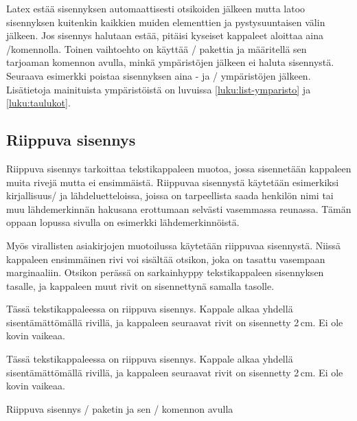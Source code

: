 Latex estää sisennyksen automaattisesti otsikoiden jälkeen mutta latoo
sisennyksen kuitenkin kaikkien muiden elementtien ja pystysuuntaisen
välin jälkeen. Jos sisennys halutaan estää, pitäisi kyseiset kappaleet
aloittaa aina \-/komennolla. Toinen vaihtoehto on
käyttää \-/ pakettia ja
määritellä sen tarjoaman komennon avulla, minkä ympäristöjen jälkeen ei
haluta sisennystä. Seuraava esimerkki poistaa sisennyksen aina
- ja \-/ ympäristöjen jälkeen.
Lisätietoja mainituista ympäristöistä on luvuissa
\ref{luku:list-ymparisto} ja \ref{luku:taulukot}.

\begin{koodilohkosis}
\end{koodilohkosis}

\subsection{Riippuva sisennys}
\label{luku:riippuva_sisennys}

Riippuva sisennys tarkoittaa tekstikappaleen muotoa, jossa sisennetään
kappaleen muita rivejä mutta ei ensimmäistä. Riippuvaa sisennystä
käytetään esimerkiksi kirjallisuus\-/{} ja lähdeluetteloissa, joissa on
tarpeellista saada henkilön nimi tai muu lähdemerkinnän hakusana
erottumaan selvästi vasemmassa reunassa. Tämän oppaan lopussa sivulla
\pageref{luku:kirjallisuutta} on esimerkki lähdemerkinnöistä.

Myös virallisten asiakirjojen muotoilussa käytetään riippuvaa
sisennystä. Niissä kappaleen ensimmäinen rivi voi sisältää otsikon, joka
on tasattu vasempaan marginaaliin. Otsikon perässä on sarkainhyppy
tekstikappaleen sisennyksen tasalle, ja kappaleen muut rivit on
sisennettynä samalla tasolle.

\begin{esimerkki*}
  \komentoi{,}

\begin{koodilohko}
Tässä tekstikappaleessa on riippuva sisennys. Kappale
alkaa yhdellä sisentämättömällä rivillä, ja kappaleen seuraavat rivit
on sisennetty 2\,cm. Ei ole kovin vaikeaa.
\end{koodilohko}
  \begin{tulos}
    Tässä tekstikappaleessa on riippuva sisennys. Kappale
    alkaa yhdellä sisentämättömällä rivillä, ja kappaleen seuraavat rivit
    on sisennetty 2\,cm. Ei ole kovin vaikeaa.
  \end{tulos}
  \caption{Riippuva sisennys \-/ paketin ja sen
    \-/ komennon avulla}
  \label{esim:riippuva_sis_hangpara}
\end{esimerkki*}

